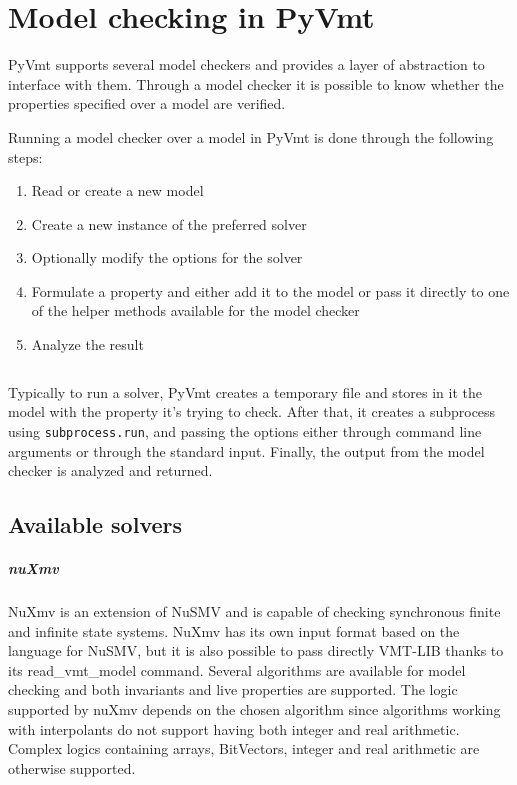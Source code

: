 \chapter{Model checking in PyVmt}
PyVmt supports several model checkers and provides a layer of abstraction to interface with them. Through a model checker it is possible to know whether the properties specified over a model are verified.

Running a model checker over a model in PyVmt is done through the following steps:
\begin{enumerate}
    \item Read or create a new model
    \item Create a new instance of the preferred solver
    \item Optionally modify the options for the solver
    \item Formulate a property and either add it to the model or pass it directly to one of the helper methods available for the model checker
    \item Analyze the result
\end{enumerate}

\inputminted[firstline=5, lastline=20]{python3}{py/model_checking.py}

Typically to run a solver, PyVmt creates a temporary file and stores in it the model with the property it's trying to check.
After that, it creates a subprocess using \texttt{subprocess.run}, and passing the options either through command line arguments or through the standard input.
Finally, the output from the model checker is analyzed and returned.

\section{Available solvers}

\paragraph*{nuXmv}
NuXmv is an extension of NuSMV and is capable of checking synchronous finite and infinite state systems. \cite{DBLP:conf/cav/CavadaCDGMMMRT14}
NuXmv has its own input format based on the language for NuSMV, but it is also possible to pass directly VMT-LIB thanks to its read\_vmt\_model command.
Several algorithms are available for model checking and both invariants and live properties are supported.
The logic supported by nuXmv depends on the chosen algorithm since algorithms working with interpolants do not support having both integer and real arithmetic. Complex logics containing arrays, BitVectors, integer and real arithmetic are otherwise supported.


